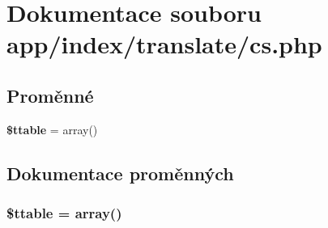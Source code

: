 \section{Dokumentace souboru app/index/translate/cs.php}
\label{dc/ddb/cs_8php}
\subsection*{Proměnné}
\begin{DoxyCompactItemize}
\item 
{\bf \$ttable} = array()
\end{DoxyCompactItemize}


\subsection{Dokumentace proměnných}
\subsubsection[{\$ttable}]{\setlength{\rightskip}{0pt plus 5cm}\$ttable = array()}\label{dc/ddb/cs_8php_a35a6a273f392214c0227565567464b17}
